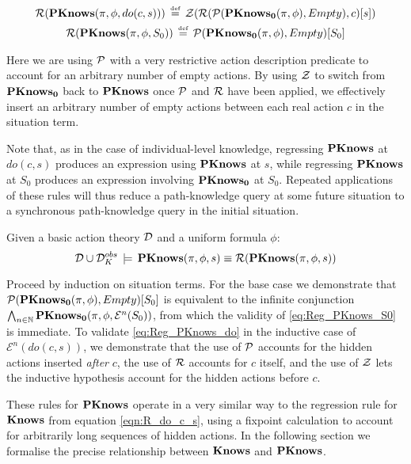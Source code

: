 \begin{gather}
\mathcal{R}(\mathbf{PKnows}(\pi,\phi,do(c,s)))\,\stackrel{\mbox{\tiny def}}{=}\,\mathcal{Z}(\mathcal{R}(\mathcal{P}(\mathbf{PKnows_{0}}(\pi,\phi),Empty),c)[s])\label{eq:Reg_PKnows_do}\\
\mathcal{R}(\mathbf{PKnows}(\pi,\phi,S_{0}))\,\stackrel{\mbox{\tiny def}}{=}\,\mathcal{P}(\mathbf{PKnows_{0}}(\pi,\phi),Empty)[S_{0}]\label{eq:Reg_PKnows_S0}\end{gather}


Here we are using $\mathcal{P}$ with a very restrictive action description
predicate to account for an arbitrary number of empty actions. By
using $\mathcal{Z}$ to switch from $\mathbf{PKnows_{0}}$ back to $\mathbf{PKnows}$ once $\mathcal{P}$
and $\mathcal{R}$ have been applied, we effectively insert an arbitrary
number of empty actions between each real action $c$ in the situation
term.

Note that, as in the case of individual-level knowledge, regressing
$\mathbf{PKnows}$ at $do(c,s)$ produces an expression using $\mathbf{PKnows}$ at
$s$, while regressing $\mathbf{PKnows}$ at $S_{0}$ produces an expression
involving $\mathbf{PKnows_{0}}$ at $S_{0}$. Repeated applications of these
rules will thus reduce a path-knowledge query at some future situation
to a synchronous path-knowledge query in the initial situation.

\begin{thm}
\label{thm:Reg_PKnows}Given a basic action theory $\mathcal{D}$ and a uniform
formula $\phi$:\[
\mathcal{D}\cup\mathcal{D}_{K}^{obs}\,\models\,\mathbf{PKnows}(\pi,\phi,s)\equiv\mathcal{R}(\mathbf{PKnows}(\pi,\phi,s))\]

\end{thm}
\begin{proofsketch}
Proceed by induction on situation terms. For the base case we demonstrate
that $\mathcal{P}(\mathbf{PKnows_{0}}(\pi,\phi),Empty)[S_{0}]$ is equivalent to the
infinite conjunction $\bigwedge_{n\in\mathbb{N}}\mathbf{PKnows_{0}}(\pi,\phi,\mathcal{E}^{n}(S_{0}))$,
from which the validity of \eqref{eq:Reg_PKnows_S0} is immediate.
To validate \eqref{eq:Reg_PKnows_do} in the inductive case of $\mathcal{E}^{n}(do(c,s))$,
we demonstrate that the use of $\mathcal{P}$ accounts for the hidden actions
inserted \emph{after} $c$, the use of $\mathcal{R}$ accounts for $c$ itself,
and the use of $\mathcal{Z}$ lets the inductive hypothesis account for the
hidden actions before $c$. 
\end{proofsketch}
These rules for $\mathbf{PKnows}$ operate in a very similar way to the regression
rule for $\mathbf{Knows}$ from equation \eqref{eqn:R_do_c_s}, using a fixpoint
calculation to account for arbitrarily long sequences of hidden actions.
In the following section we formalise the precise relationship between
$\mathbf{Knows}$ and $\mathbf{PKnows}$.

